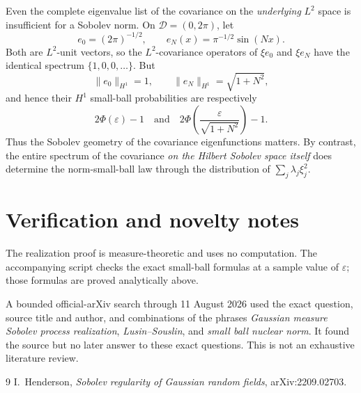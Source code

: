 \documentclass[11pt]{article}
\begin{document}
Even the complete eigenvalue list of the covariance on the
\emph{underlying} \(L^2\) space is insufficient for a Sobolev norm.  On
\(\mathcal D=(0,2\pi)\), let
\[
 e_0=(2\pi)^{-1/2},\qquad e_N(x)=\pi^{-1/2}\sin(Nx).
\]
Both are \(L^2\)-unit vectors, so the \(L^2\)-covariance operators of
\(\xi e_0\) and \(\xi e_N\) have the identical spectrum
\(\{1,0,0,\ldots\}\).  But
\[
 \|e_0\|_{H^1}=1,\qquad \|e_N\|_{H^1}=\sqrt{1+N^2},
\]
and hence their \(H^1\) small-ball probabilities are respectively
\[
 2\Phi(\varepsilon)-1
 \quad\text{and}\quad
 2\Phi\!\left(\frac{\varepsilon}{\sqrt{1+N^2}}\right)-1.
\]
Thus the Sobolev geometry of the covariance eigenfunctions matters.  By
contrast, the entire spectrum of the covariance \emph{on the Hilbert
Sobolev space itself} does determine the norm-small-ball law through the
distribution of \(\sum_j\lambda_j\xi_j^2\).

\section{Verification and novelty notes}

The realization proof is measure-theoretic and uses no computation.  The
accompanying script checks the exact small-ball formulas at a sample value
of \(\varepsilon\); those formulas are proved analytically above.

A bounded official-arXiv search through 11 August 2026 used the exact
question, source title and author, and combinations of the phrases
\emph{Gaussian measure Sobolev process realization},
\emph{Lusin--Souslin}, and \emph{small ball nuclear norm}.  It found the
source but no later answer to these exact questions.  This is not an
exhaustive literature review.

\begin{thebibliography}{9}
I.~Henderson,
\emph{Sobolev regularity of Gaussian random fields},
arXiv:2209.02703.
\end{thebibliography}
\end{document}
